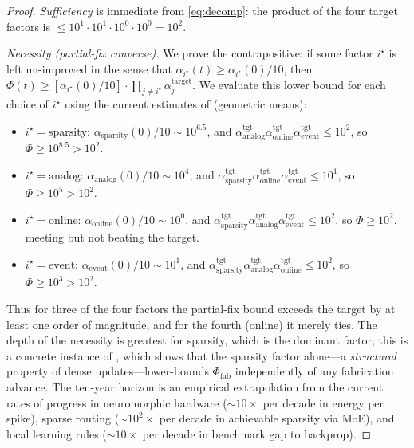 \documentclass[11pt]{article}
\theoremstyle{definition}
\theoremstyle{remark}
\begin{document}
\begin{proof}
\emph{Sufficiency} is immediate from \cref{eq:decomp}: the product
of the four target factors is $\le 10^{1}\cdot 10^{1}\cdot 10^{0}\cdot
10^{0}=10^{2}$.

\emph{Necessity (partial-fix converse).}  We prove the contrapositive:
if some factor $i^{\star}$ is left un-improved in the sense that
$\alpha_{i^{\star}}(t)\ge\alpha_{i^{\star}}(0)/10$, then
$\Phi(t)\ge[\alpha_{i^{\star}}(0)/10]\cdot\prod_{j\ne i^{\star}}\alpha_{j}^{\mathrm{target}}$.
We evaluate this lower bound for each choice of $i^{\star}$ using the
current estimates of  (geometric means):
\begin{itemize}[leftmargin=*,topsep=2pt,itemsep=1pt]
\item $i^{\star}=\mathrm{sparsity}$:
  $\alpha_{\mathrm{sparsity}}(0)/10\sim 10^{6.5}$, and
  $\alpha_{\mathrm{analog}}^{\mathrm{tgt}}\alpha_{\mathrm{online}}^{\mathrm{tgt}}\alpha_{\mathrm{event}}^{\mathrm{tgt}}\le
  10^{2}$, so $\Phi\ge 10^{8.5}>10^{2}$.
\item $i^{\star}=\mathrm{analog}$:
  $\alpha_{\mathrm{analog}}(0)/10\sim 10^{4}$, and
  $\alpha_{\mathrm{sparsity}}^{\mathrm{tgt}}\alpha_{\mathrm{online}}^{\mathrm{tgt}}\alpha_{\mathrm{event}}^{\mathrm{tgt}}\le
  10^{1}$, so $\Phi\ge 10^{5}>10^{2}$.
\item $i^{\star}=\mathrm{online}$:
  $\alpha_{\mathrm{online}}(0)/10\sim 10^{0}$, and
  $\alpha_{\mathrm{sparsity}}^{\mathrm{tgt}}\alpha_{\mathrm{analog}}^{\mathrm{tgt}}\alpha_{\mathrm{event}}^{\mathrm{tgt}}\le
  10^{2}$, so $\Phi\ge 10^{2}$, meeting but not beating the target.
\item $i^{\star}=\mathrm{event}$:
  $\alpha_{\mathrm{event}}(0)/10\sim 10^{1}$, and
  $\alpha_{\mathrm{sparsity}}^{\mathrm{tgt}}\alpha_{\mathrm{analog}}^{\mathrm{tgt}}\alpha_{\mathrm{online}}^{\mathrm{tgt}}\le
  10^{2}$, so $\Phi\ge 10^{3}>10^{2}$.
\end{itemize}
Thus for three of the four factors the partial-fix bound exceeds the
target by at least one order of magnitude, and for the fourth
(\textrm{online}) it merely ties.  The depth of the necessity is
greatest for sparsity, which is the dominant factor; this is a
concrete instance of , which shows that the
sparsity factor alone---a \emph{structural} property of dense
updates---lower-bounds $\Phi_{\mathrm{fab}}$ independently of any
fabrication advance.  The ten-year horizon is an empirical
extrapolation from the current rates of progress in neuromorphic
hardware ($\sim\!10\times$ per decade in energy per spike), sparse
routing ($\sim\!10^{2}\times$ per decade in achievable sparsity via
MoE), and local learning rules ($\sim\!10\times$ per decade in
benchmark gap to backprop).
\end{proof}
\end{document}
